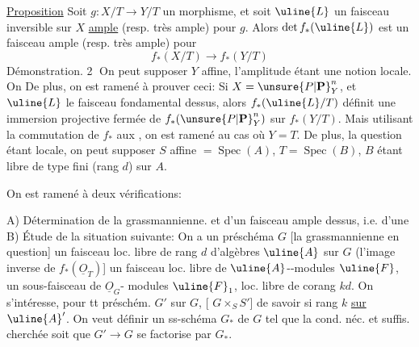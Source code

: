 \uline{Proposition} Soit $g:X/T\longrightarrow Y/T$ un morphisme, et soit $\uline{L}$ un faisceau inversible sur $X$ \uline{ample}  (resp. très ample) pour $g$. Alors $\det f_*(\uline{L})$ est un faisceau ample (resp. très ample) pour
\[
f_*(X/T)\longrightarrow f_*(Y/T)
\]
Démonstration. \textcircled{2} On peut supposer $Y$ affine, l'amplitude  étant une notion locale.  On    De plus, on est ramené à prouver ceci: Si $X=\unsure{P|\mathbf P}_Y^n$, et $\uline{L}$ le faisceau fondamental dessus, alors $f_*(\uline{L}/T)$  définit une immersion projective fermée de $f_*(\unsure{P|\mathbf P}_Y^n)$ sur  $f_*(Y/T)$. Mais utilisant la commutation de $f_*$ aux , on est ramené au cas où $Y=T$. De plus, la question étant locale, on peut supposer $S$ affine $=\operatorname{Spec}(A)$, $T=\operatorname{Spec}(B)$, $B$ étant libre de type fini (rang $d$) sur $A$.

On est ramené  à deux vérifications:

A) Détermination de la grassmannienne.
et d'un faisceau ample dessus, i.e. d'une 
B) Étude de la situation suivante: On a un préschéma $G$ [la grassmannienne en question] un faisceau loc. libre de rang $d$ d'algèbres $\uline{A}$ sur $G$ (l'image inverse de $f_*(\underline{O}_T)$] un faisceau loc. libre de $\uline{A}$--modules $\uline{F}$, un sous-faisceau de $\underline{O}_G$- modules $\uline{F}_1$,  loc. libre de corang $kd$.
On s'intéresse, pour tt préschém. $G'$ sur $G$, [ $G\times_S S'$] de savoir si    rang $k$ \uline{sur $\uline{A}'$}. On veut définir un ss-schéma  $G_*$ de $G$ tel que la cond. néc. et suffis. cherchée soit que $G'\longrightarrow G$ se factorise par $G_*$.

